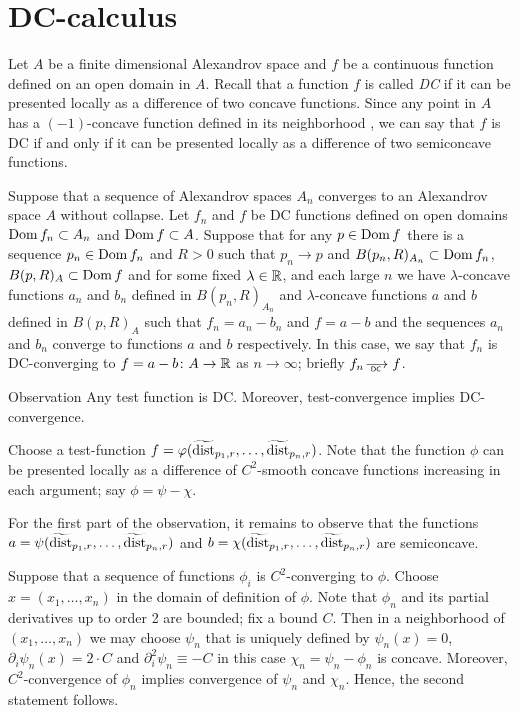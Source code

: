  
 
 
 

  
 
\section{DC-calculus}\label{sec:DC}

Let $A$ be a finite dimensional Alexandrov space and $f$ be a continuous function defined on an open domain in $A$.
Recall that a function $f$ is called \emph{DC} if it can be presented locally as a difference of two concave functions.
Since any point in $A$ has a $(-1)$-concave function defined in its neighborhood \cite[3.6]{PerMorse},
we can say that $f$ is DC if and only if it can be presented locally as a difference of two semiconcave functions. 

Suppose that a sequence of Alexandrov spaces $A_n$ converges to an Alexandrov space $A$ without collapse.
Let $f_n$ and $f$ be DC functions defined on open domains $\mathop{\rm Dom} f_n\subset A_n$ and $\mathop{\rm Dom} f \subset A$.
Suppose that for any $p\in \mathop{\rm Dom} f$ there is a sequence $p_n\in \mathop{\rm Dom} f_n$ and $R>0$ such that $p_n\to p$ and $B(p_n,R)_{A_n}\subset \mathop{\rm Dom} f_n$, $B(p,R)_{A}\subset\mathop{\rm Dom} f$
and for some fixed $\lambda\in\mathbb{R}$, and each large $n$ we have $\lambda$-concave functions $a_n$ and $b_n$ defined in $B(p_n,R)_{A_n}$ and $\lambda$-concave functions $a$ and $b$ defined in $B(p,R)_{A}$
such that $f_n=a_n-b_n$ and $f=a-b$ and the sequences
$a_n$ and $b_n$ converge to functions $a$ and $b$ respectively.
In this case, we say that $f_n$ is DC-converging to $f=a-b\colon A\to \mathbb{R}$ as $n\to\infty$; briefly $f_n\DCto f$.

\begin{thm}{Observation}\label{obs:test-DC}
Any test function is DC. Moreover, test-convergence implies DC-convergence. 
\end{thm}

Choose a test-function $f=\varphi(\widetilde{\operatorname{\rm dist}}_{p_1,r},\dots,\widetilde{\operatorname{\rm dist}}_{p_n,r})$.
Note that the function $\phi$ can be presented locally as a difference of $C^2$-smooth concave functions increasing in each argument; say $\phi=\psi-\chi$.

For the first part of the observation, it remains to observe that the functions $a=\psi(\widetilde{\operatorname{\rm dist}}_{p_1,r},\dots,\widetilde{\operatorname{\rm dist}}_{p_n,r})$ and $b=\chi(\widetilde{\operatorname{\rm dist}}_{p_1,r},\dots,\widetilde{\operatorname{\rm dist}}_{p_n,r})$ are semiconcave.

Suppose that a sequence of functions $\phi_i$ is $C^2$-converging to $\phi$.
Choose $x=(x_1,\dots,x_n)$ in the domain of definition of $\phi$.
Note that $\phi_n$ and its partial derivatives up to order 2 are bounded;
fix a bound $C$.
Then in a neighborhood of $(x_1,\dots,x_n)$ we may choose $\psi_n$ that is uniquely defined by $\psi_n(x)=0$, $\partial_i\psi_n(x)=2\cdot C$ and $\partial_i^2\psi_n\equiv -C$ in this case $\chi_n=\psi_n-\phi_n$ is concave.
Moreover, $C^2$-convergence of $\phi_n$ implies convergence of $\psi_n$ and $\chi_n$.
Hence, the second statement follows.
\qeds

